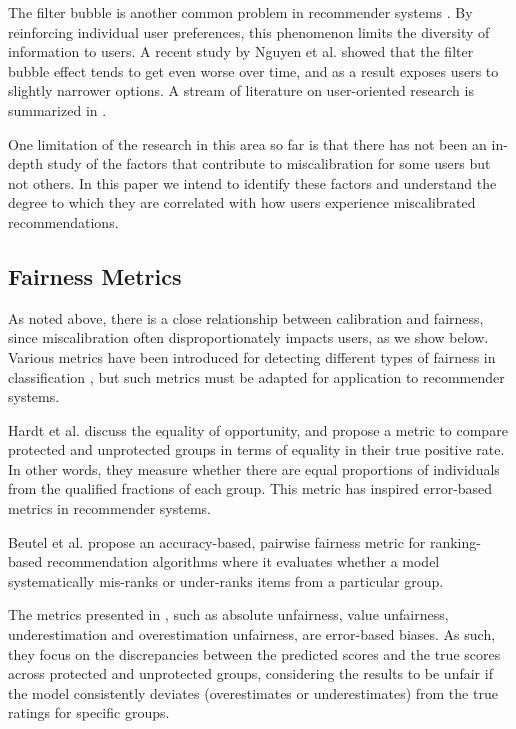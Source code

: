 The filter bubble is another common problem in recommender systems \cite{pariser2011filter}. By reinforcing individual user preferences, this phenomenon limits the diversity of information to users. A recent study by Nguyen et al. \cite{nguyen2014exploring} showed that the filter bubble effect tends to get even worse over time, and as a result exposes users to slightly narrower options. A stream of literature on user-oriented research is summarized in \cite{kunaver2017diversity}.

One limitation of the research in this area so far is that there has not been an in-depth study of the factors that contribute to miscalibration for some users but not others. In this paper we intend to identify these factors and understand the degree to which they are correlated with how users experience miscalibrated recommendations.


\subsection{Fairness Metrics}
As noted above, there is a close relationship between calibration and fairness, since miscalibration often disproportionately impacts users, as we show below. 
Various metrics have been introduced for detecting different types of fairness in classification \cite{hardt2016equality, kuhlman2019fare, calders2010three, crowson2016assessing}, but such metrics must be adapted for application to recommender systems.

Hardt et al. \cite{hardt2016equality} discuss the equality of opportunity, and propose a metric to compare protected and unprotected groups in terms of equality in their true positive rate. In other words, they measure whether there are equal proportions of individuals from the qualified fractions of each group. This metric has inspired error-based metrics in recommender systems.

Beutel et al. \cite{beutel2019fairness} propose an accuracy-based, pairwise fairness metric for ranking-based recommendation algorithms where it evaluates whether a model systematically mis-ranks or under-ranks items from a particular group.

The metrics presented in \cite{yao2017beyond}, such as absolute unfairness, value unfairness, underestimation and overestimation unfairness, are error-based biases. As such, they focus on the discrepancies between the predicted scores and the true scores across protected and unprotected groups, considering the results to be unfair if the model consistently deviates (overestimates or underestimates) from the true ratings for specific groups. %

